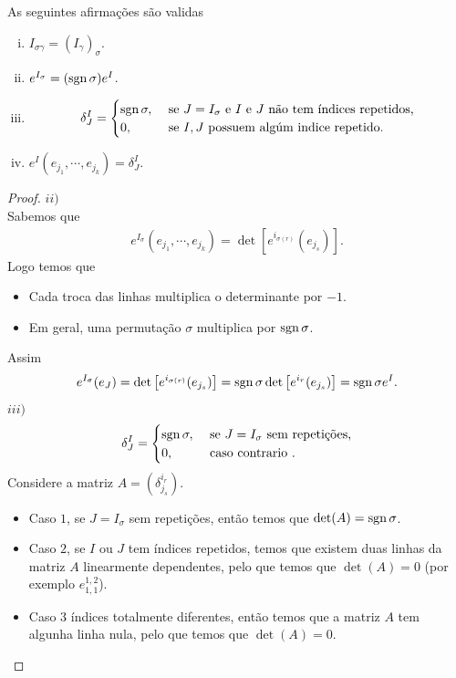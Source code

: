 \begin{proposition}\label{prop:multi-delta}
  As seguintes afirmações são validas
  \begin{enumerate}[i)]
    \item $I_{\sigma\gamma}=(I_{\gamma})_{\sigma}$.
    \item $e^{I_{\sigma}}=(\operatorname{sgn}\sigma)e^{I}$.
    \item 
      \begin{align*}
        \delta_{J}^{I}= 
        \begin{cases}
          \operatorname{sgn}\sigma, &\text{ se } J=I_{\sigma}\text{ e $I$ e $J$ não tem índices repetidos} \text{,} \\
          0, &\text{ se $I,J$ possuem algúm indice repetido}.
        \end{cases}
      \end{align*}
    \item $e^{I}(e_{j_1},\cdots,e_{j_k})=\delta_{J}^{I}$.
  \end{enumerate}
\end{proposition}
\begin{proof} 
  $ii)$\\
  Sabemos que
  \begin{align*}
    e^{I_\sigma}(e_{j_1},\cdots,e_{j_k})=\det\left[ e^{i_{\sigma(r)}}(e_{j_s}) \right].
  \end{align*}
  Logo temos que
  \begin{itemize}
    \item Cada troca das linhas multiplica o determinante por $-1$.
    \item Em geral, uma permutação $\sigma$ multiplica por $\operatorname{sgn}\sigma$.
  \end{itemize}
  Assim
  \begin{align*}
    e^{I_\sigma}(e_J)=\det\left[ e^{i_{\sigma(r)}}(e_{j_s}) \right]=\operatorname{sgn}\sigma\det\left[ e^{i_r}(e_{j_s}) \right]=\operatorname{sgn}\sigma e^{I}.
  \end{align*}
  $iii)$
  \begin{align*}
    \delta_{J}^{I}= 
    \begin{cases}
      \operatorname{sgn}\sigma, &\text{ se $J=I_{\sigma}$ sem repetições} \text{,} \\
      0, &\text{ caso contrario }.
    \end{cases}
  \end{align*}
  Considere a matriz $A=(\delta_{j_s}^{i_r})$.\\
  \begin{itemize}
    \item Caso $1$, se $J=I_\sigma$ sem repetições, então temos que $\det(A)=\operatorname{sgn}\sigma$.
    \item Caso $2$, se $I$ ou $J$ tem índices repetidos, temos que existem duas linhas da matriz $A$ linearmente dependentes, pelo que temos que $\det(A)=0$ (por exemplo $e^{1,2}_{1,1}$).
    \item Caso $3$ índices totalmente diferentes, então temos que a matriz $A$ tem algunha linha nula, pelo que temos que $\det(A)=0$. 
  \end{itemize}
\end{proof}
